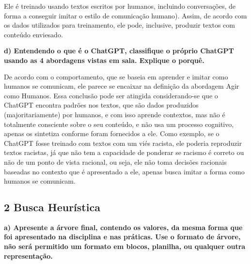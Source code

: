 Ele é treinado usando textos escritos por humanos, incluindo conversações, de forma a conseguir imitar o estilo de comunicação humano). Assim, de acordo com os dados utilizados para treinamento, ele pode, inclusive, produzir textos com conteúdo enviesado.

\begin{adjustwidth}{1em}{}
\textbf{d) Entendendo o que é o ChatGPT, classifique o próprio ChatGPT usando as 4
abordagens vistas em sala. Explique o porquê.}
\end{adjustwidth}

De acordo com o comportamento, que se baseia em aprender e imitar como humanos se comunicam, ele parece se encaixar na definição da abordagem Agir como Humanos. Essa conclusão pode ser atingida considerando-se que o ChatGPT encontra padrões nos textos, que são dados produzidos (majoritariamente) por humanos, e com isso aprende contextos, mas não é totalmente consciente sobre o seu conteúdo, e não usa um processo cognitivo, apenas os sintetiza conforme foram fornecidos a ele. Como exemplo, se o ChatGPT fosse treinado com textos com um viés racista, ele poderia reproduzir textos racistas, já que não tem a capacidade de ponderar se racismo é correto ou não de um ponto de vista racional, ou seja, ele não toma decisões racionais baseadas no contexto que é apresentado a ele, apenas busca imitar a forma como humanos se comunicam.

\subsection*{\textbf{2 Busca Heurística}}

\begin{adjustwidth}{1em}{}
\textbf{a) Apresente a árvore final, contendo os valores, da mesma forma que foi apresentado
na disciplina e nas práticas. Use o formato de árvore, não será permitido um formato em blocos,
planilha, ou qualquer outra representação.}
\end{adjustwidth}


